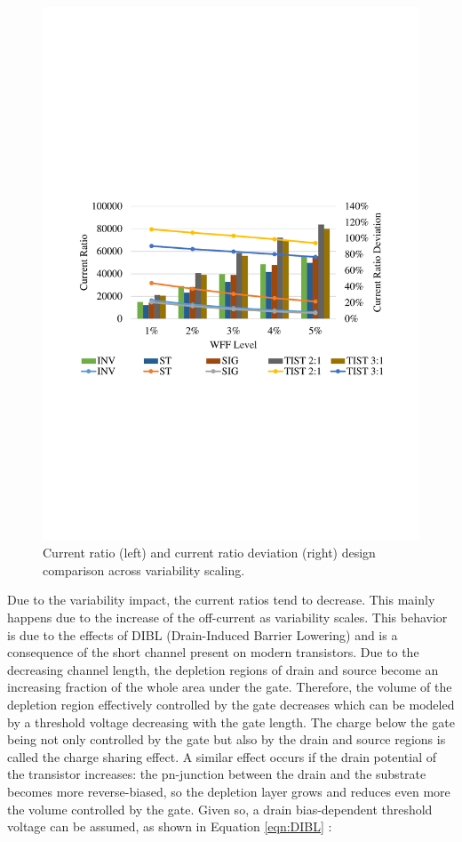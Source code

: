 \documentclass[pgmicro,mestrado,english]{iiufrgs}
\begin{document}
    \begin{figure}[]
        \centering
            \includegraphics[width=1\textwidth, trim={1.25cm 9cm 2cm 10cm}, clip]{currRatioWFF.pdf}
            \caption{Current ratio (left) and current ratio deviation (right) design comparison across variability scaling.}
        \label{figsCurrComp}
    \end{figure}
    
    Due to the variability impact, the current ratios tend to decrease. This mainly happens due to the increase of the off-current as variability scales. This behavior is due to the effects of DIBL (Drain-Induced Barrier Lowering) and is a consequence of the short channel present on modern transistors. Due to the decreasing channel length, the depletion regions of drain and source become an increasing fraction of the whole area under the gate. Therefore, the volume of the depletion region effectively controlled by the gate decreases which can be modeled by a threshold voltage decreasing with the gate length. The charge below the gate being not only controlled by the gate but also by the drain and source regions is called the charge sharing effect. A similar effect occurs if the drain potential of the transistor increases: the pn-junction between the drain and the substrate becomes more reverse-biased, so the depletion layer grows and reduces even more the volume controlled by the gate. Given so, a drain bias-dependent threshold voltage can be assumed, as shown in Equation \ref{eqn:DIBL} \cite{henzler2006power}:
    
\end{document}
